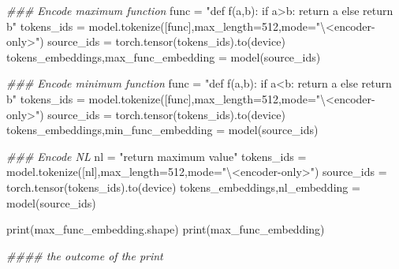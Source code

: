 \documentclass[
]{article}
\newenvironment{Shaded}{}{}
\newcommand{\BuiltInTok}[1]{\textcolor[rgb]{0.00,0.50,0.00}{#1}}
\newcommand{\CommentTok}[1]{\textcolor[rgb]{0.38,0.63,0.69}{\textit{#1}}}
\newcommand{\DecValTok}[1]{\textcolor[rgb]{0.25,0.63,0.44}{#1}}
\newcommand{\NormalTok}[1]{#1}
\newcommand{\OperatorTok}[1]{\textcolor[rgb]{0.40,0.40,0.40}{#1}}
\newcommand{\StringTok}[1]{\textcolor[rgb]{0.25,0.44,0.63}{#1}}
\begin{document}
\begin{Shaded}
  \begin{Highlighting}[]
    \CommentTok{\#\#\# Encode maximum function}
    \NormalTok{func }\OperatorTok{=} \StringTok{"def f(a,b): if a\textgreater{}b: return a else return b"}
    \NormalTok{tokens\_ids }\OperatorTok{=}\NormalTok{ model.tokenize([func],max\_length}\OperatorTok{=}\DecValTok{512}\NormalTok{,mode}\OperatorTok{=}\StringTok{"\textbackslash{}\textless{}encoder{-}only\textgreater{}"}\NormalTok{)}
    \NormalTok{source\_ids }\OperatorTok{=}\NormalTok{ torch.tensor(tokens\_ids).to(device)}
    \NormalTok{tokens\_embeddings,max\_func\_embedding }\OperatorTok{=}\NormalTok{ model(source\_ids)}

    \CommentTok{\#\#\# Encode minimum function}
    \NormalTok{func }\OperatorTok{=} \StringTok{"def f(a,b): if a\textless{}b: return a else return b"}
    \NormalTok{tokens\_ids }\OperatorTok{=}\NormalTok{ model.tokenize([func],max\_length}\OperatorTok{=}\DecValTok{512}\NormalTok{,mode}\OperatorTok{=}\StringTok{"\textbackslash{}\textless{}encoder{-}only\textgreater{}"}\NormalTok{)}
    \NormalTok{source\_ids }\OperatorTok{=}\NormalTok{ torch.tensor(tokens\_ids).to(device)}
    \NormalTok{tokens\_embeddings,min\_func\_embedding }\OperatorTok{=}\NormalTok{ model(source\_ids)}

    \CommentTok{\#\#\# Encode NL}
    \NormalTok{nl }\OperatorTok{=} \StringTok{"return maximum value"}
    \NormalTok{tokens\_ids }\OperatorTok{=}\NormalTok{ model.tokenize([nl],max\_length}\OperatorTok{=}\DecValTok{512}\NormalTok{,mode}\OperatorTok{=}\StringTok{"\textbackslash{}\textless{}encoder{-}only\textgreater{}"}\NormalTok{)}
    \NormalTok{source\_ids }\OperatorTok{=}\NormalTok{ torch.tensor(tokens\_ids).to(device)}
    \NormalTok{tokens\_embeddings,nl\_embedding }\OperatorTok{=}\NormalTok{ model(source\_ids)}

    \BuiltInTok{print}\NormalTok{(max\_func\_embedding.shape)}
    \BuiltInTok{print}\NormalTok{(max\_func\_embedding)}

    \CommentTok{\#\#\#\# the outcome of the print}


\end{Highlighting}
\end{Shaded}
\end{document}
